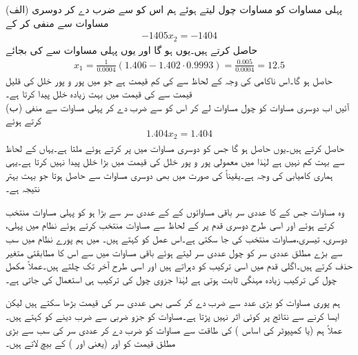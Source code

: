 (الف)  پہلی مساوات کو مساوات چول لیتے ہوئے ہم اس کو  سے ضرب دے کر دوسری مساوات سے منفی کر کے
\begin{align*}
-1405x_2=-1404
\end{align*}
حاصل کرتے ہیں۔یوں  ہو گا اور یوں پہلی مساوات سے  کی بجائے 
\begin{align*}
x_1=\frac{1}{0.0004}(1.406-1.402\cdot 0.9993)=\frac{0.005}{0.0004}=12.5
\end{align*}
حاصل ہو گا۔اس ناکامی کی وجہ  کے لحاظ سے   کی کم قیمت ہے جو  میں پور و پور خلل کی قلیل قیمت سے  کی قیمت میں بہت زیادہ خلل پیدا کرتا ہے۔\\
(ب) آئیں اب دوسری مساوات کو چول مساوات لے کر اس کو  سے ضرب دے کر پہلی مساوات سے منفی کرتے ہوئے
\begin{align*}
1.404x_2=1.404
\end{align*}
حاصل کرتے ہیں۔یوں  حاصل ہو گا جس کو دوسری مساوات میں پر کرتے ہوئے  ملتا ہے۔یہاں  کے لحاظ سے  بہت کم نہیں ہے لہٰذا  میں معمولی پور و پور خلل  کی قیمت میں بڑا خلل پیدا نہیں کرتا ہے۔یہی ہماری کامیابی کی  وجہ ہے۔یقیناً  کی صورت میں بھی دوسری مساوات سے  حاصل ہوتا جو بہت بہتر نتیجہ  ہے۔

وہ مساوات جس کے  کا عددی سر باقی مساواتوں کے  کے عددی سر سے بڑا ہو کو پہلی مساوات منتخب کرتے ہوئے اور اسی طرح دوسری قدم پر  کے لحاظ سے مساوات منتخب کرتے ہوئے نظام میں پہلی، دوسری، تیسری، مساوات منتخب کی جا سکتی ہے۔اس عمل کو  کہتے ہیں۔  میں ہم  پورے نظام میں سب سے بڑے مطلق عددی سر کو چول عددی سر لیتے ہوئے باقی مساوات میں سے اس کا مطابقتی متغیر حذف کرتے ہیں۔اگلی قدم میں اسی ترکیب کو دہراتے ہیں اور اسی طرح آخر تک چلتے ہیں۔عملاً مکمل چول کی ترکیب زیادہ مہنگی ثابت ہوتی ہے لہٰذا جزوی چول کی ترکیب ہی استعمال کی جاتی ہے۔

ہم پوری مساوات کو بڑی عدد سے ضرب دے کر کسی بھی عددی سر کی قیمت بڑھا سکتے ہیں لیکن ایسا کرنے سے نتائج پر کوئی اثر نہیں پڑتا ہے۔مساوات کو جزو ضربی سے ضرب دینے کو   کہتے ہیں۔عملاً ہم  (یا کمپیوٹر کی اساس ) کی طاقت سے مساوات کو ضرب دے کر عددی سر کی سب سے بڑی مطلق قیمت کو  اور  (یعنی  اور ) کے بیچ لاتے ہیں۔

